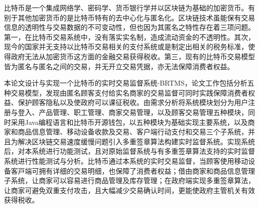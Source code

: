  
\begin{cabstract}

	⽐特币是⼀个集成网络学、密码学、货币银⾏学并以区块链为基础的加密货币。有别于其他加密货币的是⽐特币特有的去中⼼化与匿名化。区块链技术虽能保有交易信息的透明性与交易数据的不可变动性，但也因为其匿名之特性存在着三项问题。第一，在⽐特币交易系统中，没有落实实名制，造成流动资金的不透明性。其次，现今的国家并无⽀持以⽐特币交易相关的⽀付系统或是制定出相关的税务标准，使得政府无法从加密货币这⽅⾯的⾦融交易获得税收。第三，现有的⽐特币交易模型皆为匿名与匿名之间的交易，并无开⽴交易凭据，亦无法保障消费者权益。

	本论⽂设计与实现⼀个比特币的实时交易监督系统-BRTMS，论文工作包括分析五种交易模型，发现由匿名顾客支付给实名商家的交易监督可同时实践保障消费者权益、保护顾客隐私以及使政府可以课征税收。由需求分析将系统模块划分为用户注册与登入、产品管理、职工管理、商家交易管理，以及顾客交易管理五种模块，同时采用Java编程语言和比特币开源钱包，以五种模块为基础实现主要系统，以及商家和商品信息管理、移动设备收款及交易、客户端行动支付和交易三个子系统，并且为解决区块链交易速度缓慢问题引入多重签章算法构建实时监督系统。实现系统后，对本系统进行功能测试，且对原始监督系统与有多重签章算法支持的实时监督系统进行性能测试与分析。比特币通过本系统的实时交易监督，当顾客使用移动设备客⼾端可拥有详细的交易明细，也保障了消费者权益；借由商家和商品信息管理子系统，让商家可以容易进⾏商品管理及库存管理；在政府端实现多重签章算法，让商家可避免双重⽀付攻击，且大幅减少交易确认时间，更能使政府主管机关有效获得税收。

\end{cabstract}

